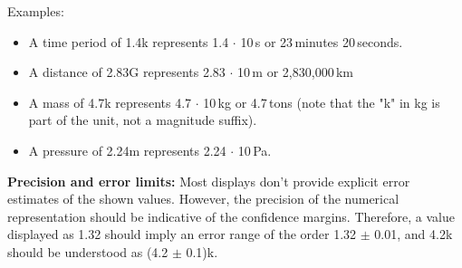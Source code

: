 \documentclass[Orbiter User Manual.tex]{subfiles}
\begin{document}
Examples:
\begin{itemize}
	\item A time period of 1.4k represents 1.4 $\cdot$ 10\,s or
		23\,minutes 20\,seconds.
	\item A distance of 2.83G represents 2.83 $\cdot$ 10\,m or
		2,830,000\,km
	\item A mass of 4.7k represents 4.7 $\cdot$ 10\,kg or 4.7\,tons
		(note that the "k" in kg is part of the unit, not a magnitude suffix).
	\item A pressure of 2.24m represents 2.24 $\cdot$ 10\,Pa.
\end{itemize}

\textbf{Precision and error limits:}
Most displays don't provide explicit error estimates of the shown values.
However, the precision of the numerical representation should be indicative of
the confidence margins. Therefore, a value displayed as 1.32 should imply an
error range of the order 1.32 $\pm$ 0.01, and 4.2k should be understood as
(4.2 $\pm$ 0.1)k.
\end{document}
